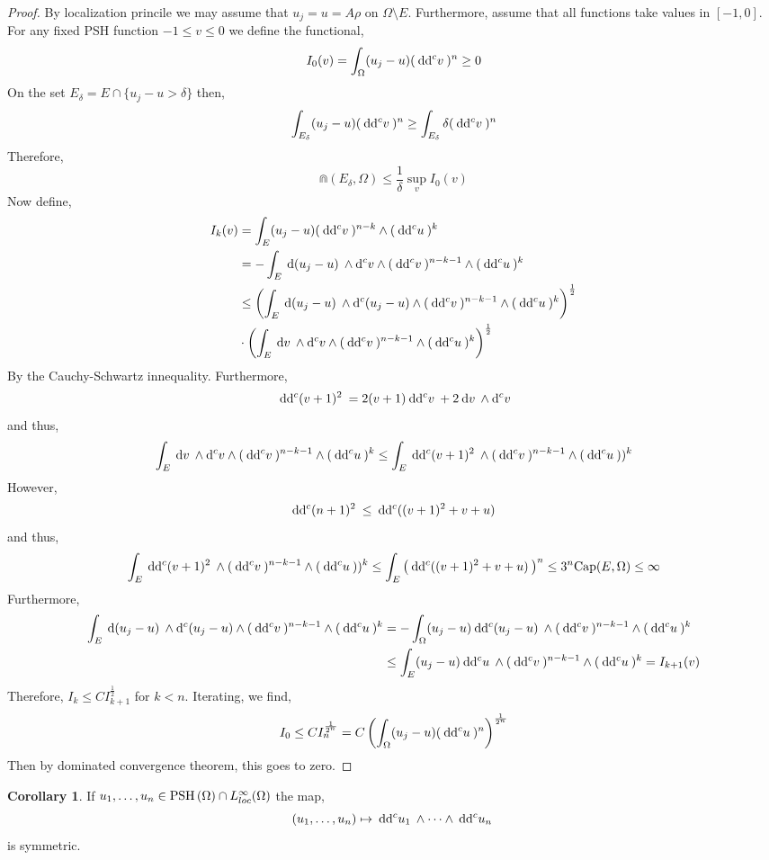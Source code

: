 \documentclass[12pt]{extarticle}
\renewcommand{\d}[1]{\: \mathrm{d}#1 \:}
\theoremstyle{definition}
\newtheorem{corollary}[theorem]{Corollary}
\begin{document}
\begin{proof}
By localization princile we may assume that $u_j = u = A \rho$ on $\Omega \setminus E$. Furthermore, assume that all functions take values in $[-1,0]$. For any fixed PSH function $-1 \le v \le 0$ we define the functional,
\[ I_0(v) = \int_\Omega (u_j - u) (\ddc{v})^n \ge 0 \]
On the set $E_\delta = E \cap \{ u_j - u > \delta \}$ then,
\[ \int_{E_\delta} (u_j - u) (\ddc{v})^n \ge \int_{E_\delta} \delta (\ddc{v})^n \]
Therefore,
\[ \Cap(E_\delta, \Omega) \le \frac{1}{\delta} \sup_v I_0(v) \]
Now define,
\begin{align*}
I_k(v)  & = \int_{E} (u_j - u) (\ddc{v})^{n - k} \wedge (\ddc{u})^k
\\
& = - \int_E \d{(u_j - u)} \wedge \dc{v} \wedge (\ddc{v})^{n - k - 1} \wedge (\ddc{u})^{k}
\\
& \le \left( \int_E \d{(u_j - u)} \wedge \dc{(u_j - u)} \wedge (\ddc{v})^{n - k - 1} \wedge (\ddc{u})^{k} \right)^{\frac{1}{2}}
\\
& \cdot \left( \int_E \d{v} \wedge \dc{v} \wedge (\ddc{v})^{n - k - 1} \wedge (\ddc{u})^{k} \right)^{\frac{1}{2}}
\end{align*}
By the Cauchy-Schwartz innequality. Furthermore,
\[ \ddc{(v + 1)^2} = 2 (v + 1) \ddc{v} + 2 \d{v} \wedge \dc{v} \]
and thus,
\[ \int_E \d{v} \wedge \dc{v} \wedge (\ddc{v})^{n - k - 1} \wedge (\ddc{u})^{k} \le \int_E \ddc{(v + 1)^2} \wedge (\ddc{v})^{n - k - 1} \wedge (\ddc{u}))^k \]
However,
\[ \ddc{(n+1)^2} \le \ddc{( ( v + 1)^2 + v + u )} \]
and thus,
\[ \int_E \ddc{(v + 1)^2} \wedge (\ddc{v})^{n - k - 1} \wedge (\ddc{u}))^k \le \int_E \left( \ddc{((v + 1)^2 + v + u)} \right)^n \le 3^n \Cap(E, \Omega) \le \infty \]
Furthermore, 
\begin{align*}
\int_E \d{(u_j - u)} \wedge \dc{(u_j - u)} \wedge (\ddc{v})^{n - k - 1} \wedge (\ddc{u})^{k} & = - \int_\Omega (u_j - u) \ddc{(u_j - u)} \wedge (\ddc{v})^{n - k - 1} \wedge (\ddc{u})^{k}
\\
& \le \int_E (u_j - u) \ddc{u} \wedge (\ddc{v})^{n - k - 1} \wedge (\ddc{u})^k = I_{k+1}(v) 
\end{align*}
Therefore, $I_k \le C I_{k+1}^{\frac{1}{2}}$ for $k < n$. Iterating, we find,
\[ I_0 \le C I_n^{\frac{1}{2^n}} = C \left( \int_\Omega (u_j - u) (\ddc{u})^n \right)^{\frac{1}{2^n}} \]
Then by dominated convergence theorem, this goes to zero. 
\end{proof}

\begin{corollary}
If $u_1, \dots, u_n \in \mathrm{PSH}\left( \Omega \right) \cap L^\infty_{loc}(\Omega)$ the map,
\[ (u_1, \dots, u_n) \mapsto \ddc{u_1} \wedge \cdots \wedge \ddc{u_n} \]
is symmetric.
\end{corollary}
\end{document}
